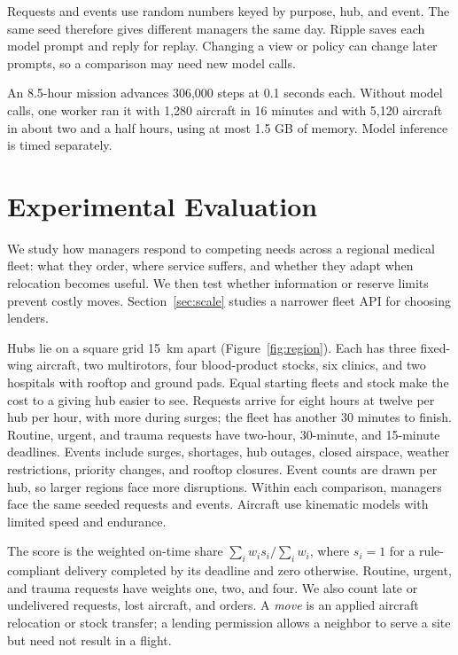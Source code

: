 \documentclass[letterpaper,10pt,conference]{ieeeconf}
\begin{document}
Requests and events use random numbers keyed by purpose, hub, and event.
The same seed therefore gives different managers the same day. Ripple
saves each model prompt and reply for replay. Changing a view or policy
can change later prompts, so a comparison may need new model calls.

An 8.5-hour mission advances 306,000 steps at 0.1 seconds each. Without
model calls, one worker ran it with 1,280 aircraft in 16 minutes and with
5,120 aircraft in about two and a half hours, using at most 1.5 GB of
memory. Model inference is timed separately.

\section{Experimental Evaluation}
\label{sec:experiments}

We study how managers respond to competing needs across a regional medical
fleet: what they order, where service suffers, and whether they adapt when
relocation becomes useful. We then test whether information or reserve
limits prevent costly moves. Section~\ref{sec:scale} studies a narrower
fleet API for choosing lenders.

Hubs lie on a square grid 15~km apart (Figure~\ref{fig:region}). Each has
three fixed-wing aircraft, two multirotors, four blood-product stocks, six
clinics, and two hospitals with rooftop and ground pads. Equal starting
fleets and stock make the cost to a giving hub easier to see. Requests
arrive for eight hours at twelve per hub per hour, with more during surges;
the fleet has another 30 minutes to finish. Routine, urgent, and trauma
requests have two-hour, 30-minute, and 15-minute deadlines. Events include
surges, shortages, hub outages, closed airspace, weather restrictions,
priority changes, and rooftop closures. Event counts are drawn per hub,
so larger regions face more disruptions. Within each comparison, managers
face the same seeded requests and events. Aircraft use kinematic models
with limited speed and endurance.

The score is the weighted on-time share $\sum_i w_i s_i/\sum_i w_i$,
where $s_i=1$ for a rule-compliant delivery completed by its deadline and
zero otherwise. Routine, urgent, and trauma requests have weights one,
two, and four. We also count late or undelivered requests, lost aircraft,
and orders. A \emph{move} is an applied aircraft relocation or stock
transfer; a lending permission allows a neighbor to serve a site but need
not result in a flight.
\end{document}
